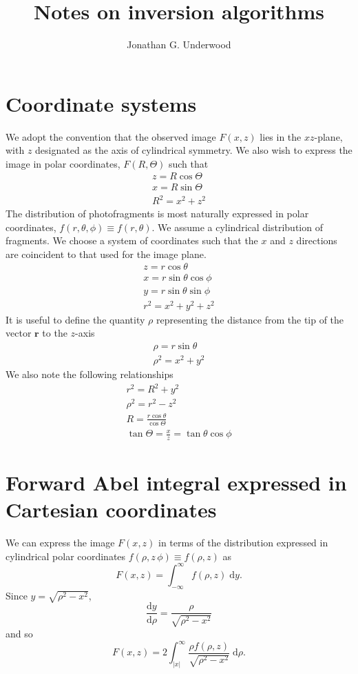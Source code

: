 \documentclass{article}
\title{Notes on inversion algorithms}
\author {Jonathan G. Underwood}
\begin{document}
\maketitle
\tableofcontents

\section{Coordinate systems}
We adopt the convention that the observed image $F(x,z)$ lies in the
$xz$-plane, with $z$ designated as the axis of cylindrical symmetry. We also
wish to express the image in polar coordinates, $F(R, \Theta)$ such that
\begin{gather}
  z=R\cos\Theta\\
  x=R\sin\Theta\\
  R^2=x^2+z^2
\end{gather}
The distribution of photofragments is most naturally expressed in polar
coordinates, $f(r, \theta, \phi)\equiv f(r, \theta)$. We assume a cylindrical
distribution of fragments. We choose a system of coordinates such that the $x$
and $z$ directions are coincident to that used for the image plane.
\begin{gather}
  z=r\cos\theta\\
  x=r\sin\theta\cos\phi\\
  y=r\sin\theta\sin\phi\\
  r^2=x^2+y^2+z^2
\end{gather}
It is useful to define the quantity $\rho$ representing the distance from the
tip of the vector $\mathbf{r}$ to the $z$-axis
\begin{gather}
  \rho=r\sin\theta\\
  \rho^2=x^2+y^2
\end{gather}
We also note the following relationships
\begin{gather}
  r^2=R^2+y^2\\
  \rho^2=r^2-z^2\\
  R=\frac{r\cos\theta}{\cos\Theta}\\
  \tan\Theta=\frac{x}{z}=\tan\theta\cos\phi
\end{gather}


\section{Forward Abel integral expressed in Cartesian coordinates}
We can express the image $F(x,z)$ in terms of the distribution expressed in
cylindrical polar coordinates $f(\rho,z\, \phi)\equiv f(\rho, z)$ as 
\begin{equation}
  F(x,z)=\int_{-\infty}^{\infty}
  f(\rho, z)\;\mathrm{d}y.
\end{equation}
Since $y=\sqrt{\rho^2-x^2}$,
\begin{equation}
  \frac{\mathrm{d}y}{\mathrm{d}\rho}
  =\frac{\rho}{\sqrt{\rho^2-x^2}}
\end{equation}
and so
\begin{equation}
  \label{eq:abel_cartesian}
  F(x,z)=2\int_{|x|}^{\infty}
  \frac{\rho f(\rho, z)}{\sqrt{\rho^2-x^2}}
  \;\mathrm{d}\rho.
\end{equation}
\end{document}
